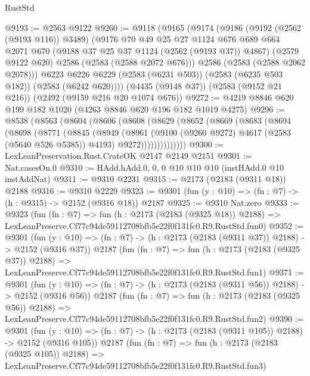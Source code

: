 \begin{lexlean}{RustStd}
\begin{coremodule}
@9193 := @2563 @9122
@9260 := @9118
    (@9165
      (@9174
        (@9186
          (@9192 (@2562 (@9193 @116)) @3489)
          (@9176
            @70
            @49
            @25
            @27
            @1124
            @676
            @689
            @664
            @2071
            @670
            (@9188 @37 @25 @37 @1124 (@2562 (@9193 @37)) @4867)
            (@2579 @9122 @620)
            @2586
            (@2583 (@2588 @2072 @676)))
          @2586
          (@2583 (@2588 @2062 @2078)))
        @6223
        @6226
        @6229
        (@2583 (@6231 @503))
        (@2583 (@6235 @503 @182))
        (@2583 (@6242 @620))))
    (@4435 (@9148 @37))
    (@2583 (@9152 @21 @216))
    (@2492 (@9159 @216 @20 @1074 @676))
@9272 := @4219 @8846 @620 @199 @182 @1020 (@4263 @8846 @620 @196 @182 @1019 @4275)
@9296 := @8538
    (@8563
      (@8604
        (@8606
          (@8608
            (@8629
              (@8652
                (@8669
                  (@8683
                    (@8694
                      (@8698
                        (@8771
                          (@8845
                            (@8949
                              (@8961
                                (@9100 (@9260 @9272) @4617 (@2583 (@5640 @526 @5385)) @4193)
                                @9272))))))))))))))
@9300 := LexLeanPreservation.Rust.CrateOK @2147 @2149 @2151
@9301 := Nat.casesOn.{0}
@9310 := HAdd.hAdd.{0, 0, 0} @10 @10 @10 (instHAdd.{0} @10 instAddNat)
@9311 := @9310 @2231
@9315 := @2173 (@2183 (@9311 @18)) @2188
@9316 := @9310 @2229
@9323 := @9301 (fun (y : @10) => (fn : @7) -> (h : @9315) -> @2152 (@9316 @18)) @2187
@9325 := @9310 Nat.zero
@9333 := @9323
    (fun (fn : @7) =>
    fun (h : @2173 (@2183 (@9325 @18)) @2188) =>
    LexLeanPreserve.Cf77c94de59112708bfb5e22f0f131fc0.R9.RustStd.fun0)
@9352 := @9301
    (fun (y : @10) => (fn : @7) -> (h : @2173 (@2183 (@9311 @37)) @2188) -> @2152 (@9316 @37))
    @2187
    (fun (fn : @7) =>
    fun (h : @2173 (@2183 (@9325 @37)) @2188) =>
    LexLeanPreserve.Cf77c94de59112708bfb5e22f0f131fc0.R9.RustStd.fun1)
@9371 := @9301
    (fun (y : @10) => (fn : @7) -> (h : @2173 (@2183 (@9311 @56)) @2188) -> @2152 (@9316 @56))
    @2187
    (fun (fn : @7) =>
    fun (h : @2173 (@2183 (@9325 @56)) @2188) =>
    LexLeanPreserve.Cf77c94de59112708bfb5e22f0f131fc0.R9.RustStd.fun2)
@9390 := @9301
    (fun (y : @10) => (fn : @7) -> (h : @2173 (@2183 (@9311 @105)) @2188) -> @2152 (@9316 @105))
    @2187
    (fun (fn : @7) =>
    fun (h : @2173 (@2183 (@9325 @105)) @2188) =>
    LexLeanPreserve.Cf77c94de59112708bfb5e22f0f131fc0.R9.RustStd.fun3)

\end{coremodule}
\end{lexlean}
